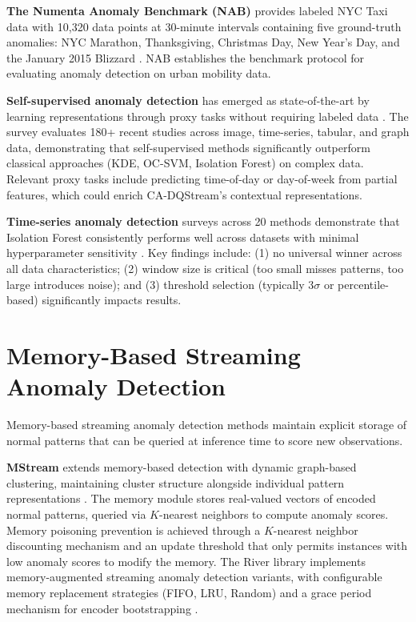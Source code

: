 \textbf{The Numenta Anomaly Benchmark (NAB)} provides labeled NYC Taxi data with 10,320 data points at 30-minute intervals containing five ground-truth anomalies: NYC Marathon, Thanksgiving, Christmas Day, New Year's Day, and the January 2015 Blizzard \citep{nab2020}. NAB establishes the benchmark protocol for evaluating anomaly detection on urban mobility data.

\textbf{Self-supervised anomaly detection} has emerged as state-of-the-art by learning representations through proxy tasks without requiring labeled data \citep{hojjati2025selfsupervised}. The survey evaluates 180+ recent studies across image, time-series, tabular, and graph data, demonstrating that self-supervised methods significantly outperform classical approaches (KDE, OC-SVM, Isolation Forest) on complex data. Relevant proxy tasks include predicting time-of-day or day-of-week from partial features, which could enrich CA-DQStream's contextual representations.

\textbf{Time-series anomaly detection} surveys across 20 methods demonstrate that Isolation Forest consistently performs well across datasets with minimal hyperparameter sensitivity \citep{braei2020timeseries}. Key findings include: (1) no universal winner across all data characteristics; (2) window size is critical (too small misses patterns, too large introduces noise); and (3) threshold selection (typically 3$\sigma$ or percentile-based) significantly impacts results.

\section{Memory-Based Streaming Anomaly Detection}

Memory-based streaming anomaly detection methods maintain explicit storage of normal patterns that can be queried at inference time to score new observations.

\textbf{MStream} extends memory-based detection with dynamic graph-based clustering, maintaining cluster structure alongside individual pattern representations \citep{siddiqui2019mstream}. The memory module stores real-valued vectors of encoded normal patterns, queried via $K$-nearest neighbors to compute anomaly scores. Memory poisoning prevention is achieved through a $K$-nearest neighbor discounting mechanism and an update threshold that only permits instances with low anomaly scores to modify the memory. The River library implements memory-augmented streaming anomaly detection variants, with configurable memory replacement strategies (FIFO, LRU, Random) and a grace period mechanism for encoder bootstrapping \citep{montiel2021river}.

